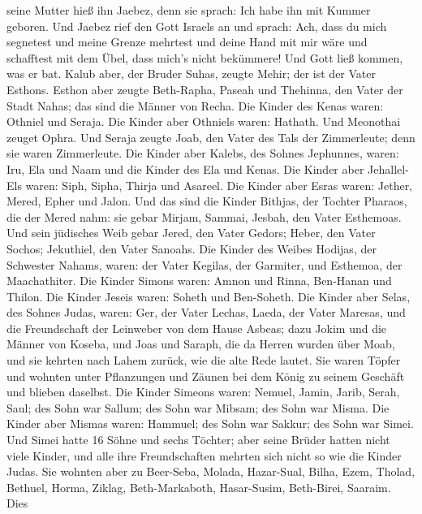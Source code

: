 seine Mutter hieß ihn Jaebez, denn sie sprach: Ich habe ihn mit Kummer
geboren.  Und Jaebez rief den Gott Israels an und sprach:
Ach, dass du mich segnetest und meine Grenze mehrtest und deine Hand mit
mir wäre und schafftest mit dem Übel, dass mich's nicht bekümmere! Und
Gott ließ kommen, was er bat.  Kalub aber, der Bruder
Suhas, zeugte Mehir; der ist der Vater Esthons.  Esthon
aber zeugte Beth-Rapha, Paseah und Thehinna, den Vater der Stadt Nahas;
das sind die Männer von Recha.  Die Kinder des Kenas waren:
Othniel und Seraja. Die Kinder aber Othniels waren: Hathath.
 Und Meonothai zeuget Ophra. Und Seraja zeugte Joab, den
Vater des Tals der Zimmerleute; denn sie waren Zimmerleute.
 Die Kinder aber Kalebs, des Sohnes Jephunnes, waren: Iru,
Ela und Naam und die Kinder des Ela und Kenas.  Die Kinder
aber Jehallel-Els waren: Siph, Sipha, Thirja und Asareel. 
Die Kinder aber Esras waren: Jether, Mered, Epher und Jalon. Und das
sind die Kinder Bithjas, der Tochter Pharaos, die der Mered nahm: sie
gebar Mirjam, Sammai, Jesbah, den Vater Esthemoas.  Und
sein jüdisches Weib gebar Jered, den Vater Gedors; Heber, den Vater
Sochos; Jekuthiel, den Vater Sanoahs.  Die Kinder des
Weibes Hodijas, der Schwester Nahams, waren: der Vater Kegilas, der
Garmiter, und Esthemoa, der Maachathiter.  Die Kinder
Simons waren: Amnon und Rinna, Ben-Hanan und Thilon. Die Kinder Jeseis
waren: Soheth und Ben-Soheth.  Die Kinder aber Selas, des
Sohnes Judas, waren: Ger, der Vater Lechas, Laeda, der Vater Maresas,
und die Freundschaft der Leinweber von dem Hause Asbeas; 
dazu Jokim und die Männer von Koseba, und Joas und Saraph, die da Herren
wurden über Moab, und sie kehrten nach Lahem zurück, wie die alte Rede
lautet.  Sie waren Töpfer und wohnten unter Pflanzungen und
Zäunen bei dem König zu seinem Geschäft und blieben daselbst.
 Die Kinder Simeons waren: Nemuel, Jamin, Jarib, Serah,
Saul;  des Sohn war Sallum; des Sohn war Mibsam; des Sohn
war Misma.  Die Kinder aber Mismas waren: Hammuel; des Sohn
war Sakkur; des Sohn war Simei.  Und Simei hatte 16 Söhne
und sechs Töchter; aber seine Brüder hatten nicht viele Kinder, und alle
ihre Freundschaften mehrten sich nicht so wie die Kinder Judas.
 Sie wohnten aber zu Beer-Seba, Molada, Hazar-Sual,
 Bilha, Ezem, Tholad,  Bethuel, Horma, Ziklag,
 Beth-Markaboth, Hasar-Susim, Beth-Birei, Saaraim. Dies
